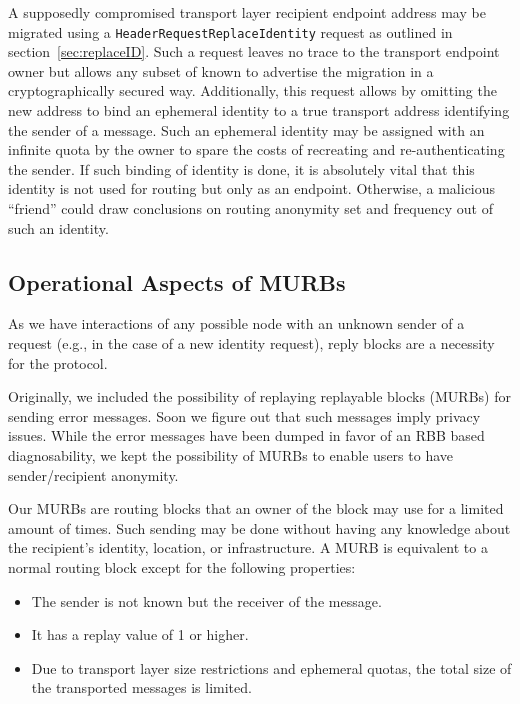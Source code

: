 A supposedly compromised transport layer recipient endpoint address may be migrated using a \texttt{HeaderRequestReplaceIdentity} request as outlined in section~\ref{sec:replaceID}. Such a request leaves no trace to the transport endpoint owner but allows any subset of known \VortexNode{} to advertise the migration in a cryptographically secured way. Additionally, this request allows by omitting the new address to bind an ephemeral identity to a true transport address identifying the sender of a message. Such an ephemeral identity may be assigned with an infinite quota by the owner to spare the costs of recreating and re-authenticating the sender. If such binding of identity is done, it is absolutely vital that this identity is not used for routing but only as an endpoint. Otherwise, a malicious ``friend'' could draw conclusions on routing anonymity set and frequency out of such an identity.

\subsection{Operational Aspects of MURBs\label{sec:murb}}
As we have interactions of any possible node with an unknown sender of a request (e.g., in the case of a new identity request), reply blocks are a necessity for the \MessageVortex{} protocol.

Originally, we included the possibility of replaying replayable blocks (MURBs) for sending error messages. Soon we figure out that such messages imply privacy issues. While the error messages have been dumped in favor of an RBB based diagnosability, we kept the possibility of MURBs to enable users to have sender/recipient anonymity. 

Our MURBs are routing blocks that an owner of the block may use for a limited amount of times. Such sending may be done without having any knowledge about the recipient's identity, location, or infrastructure. A MURB is equivalent to a normal routing block except for the following properties:

\begin{itemize}
	\item The sender is not known but the receiver of the message.
	\item It has a replay value of 1 or higher.
	\item Due to transport layer size restrictions and ephemeral quotas, the total size of the transported messages is limited.
\end{itemize}

